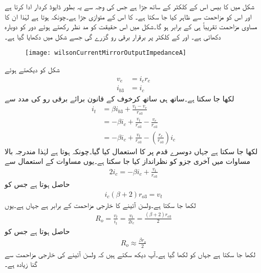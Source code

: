 شکل  میں  کا بیس اس کے کلکٹر کے ساتھ جڑا ہے جس  کی وجہ سے یہ بطور ڈایوڈ کردار ادا کرتا ہے اور اس کو مزاحمت  سے ظاہر کیا جا سکتا ہے۔ کا  اس  کے متوازی جڑا ہے۔چونکہ  ہوتا ہے لہٰذا ان کا مساوی مزاحمت تقریباً  ہی کے برابر ہو گا۔شکل  میں اس حقیقت کو مد نظر رکھتے ہوئے دور کو دوبارہ دکھائی ہے۔ اور  کے کلکٹر پر برقرار  برقی رو گزرے گی جسے شکل میں دکھایا گیا ہے۔
\begin{figure}
\centering
\texttt{[image: wilsonCurrentMirrorOutputImpedanceA]}
\caption{}
\label{شکل_تفرقی_ولسن_آئینے_کی_خارجی_مزاحمت_الف}
\end{figure}
شکل کو دیکھتے ہوئے
\begin{align*}
v_e&=i_c r_e\\
i_{b3}&=i_c
\end{align*}
لکھا جا سکتا ہے۔ساتھ ہی ساتھ کرخوف کے قانون برائے برقی رو کی مدد سے
\begin{align*}
i_t&=\beta i_{b3} +\frac{v_t-v_e}{r_{o3}}\\
&=-\beta i_c +\frac{v_t}{r_{o3}}-\frac{v_e}{r_{o3}}\\
&=-\beta i_c +\frac{v_t}{r_{o3}}-\left(\frac{r_e}{r_{o3}}\right) i_c
\end{align*}
لکھا جا سکتا ہے جہاں دوسرے قدم پر  کا استعمال کیا گیا۔چونکہ  ہوتا ہے لہٰذا مندرجہ بالا مساوات میں آخری جزو کو نظرانداز کیا جا سکتا ہے۔یوں مساوات  کے استعمال سے 
\begin{align*}
2 i_c=-\beta i_c +\frac{v_t}{r_{o3}}
\end{align*}
حاصل ہوتا ہے جس کو
\begin{align*}
i_c \left(\beta+2 \right) r_{o3}=v_t
\end{align*}
لکھا جا سکتا ہے۔ولسن آئینے کا خارجی مزاحمت  کے برابر ہے جہاں  ہے۔یوں
\begin{align}
R_o=\frac{v_t}{i_t}=\frac{v_t}{2 i_c}=\frac{\left(\beta+2 \right) r_{o3}}{2}
\end{align}
حاصل ہوتا ہے جس کو
\begin{align} \label{مساوات_تفرقی_ولسن_کی_خارجی_مزاحمت}
R_o \approx \frac{\beta r_{o}}{2}
\end{align}
لکھا جا سکتا ہے جہاں  کو  لکھا گیا ہے۔آپ دیکھ سکتے ہیں کہ ولسن آئینے کی خارجی مزاحمت  سے  گنا زیادہ ہے۔


